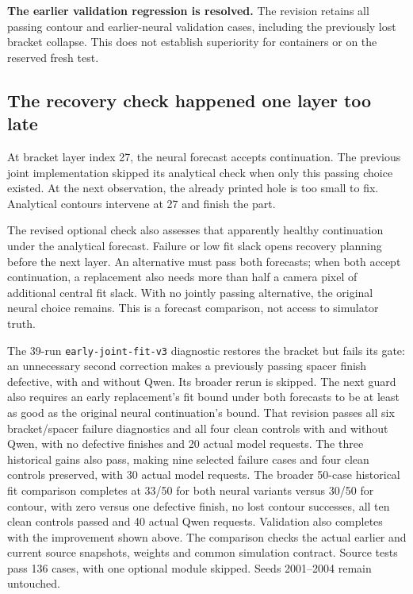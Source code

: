 \documentclass[10pt,letterpaper]{article}
\newcommand{\note}[1]{\begin{tcolorbox}[colback=pale,colframe=teal!55,boxrule=0.5pt,arc=2pt,left=8pt,right=8pt,top=5pt,bottom=5pt]#1\end{tcolorbox}}
\begin{document}
\note{\textbf{The earlier validation regression is resolved.} The revision retains all passing
contour and earlier-neural validation cases, including the previously lost
bracket collapse. This does not establish superiority for containers or on the
reserved fresh test.}

\subsection*{The recovery check happened one layer too late}
At bracket layer index 27, the neural forecast accepts continuation. The previous
joint implementation skipped its analytical check when only this passing choice
existed. At the next observation, the already printed hole is too small to fix.
Analytical contours intervene at 27 and finish the part.

The revised optional check also assesses that apparently healthy continuation
under the analytical forecast. Failure or low fit slack opens recovery planning
before the next layer. An alternative must pass both forecasts; when both accept
continuation, a replacement also needs more than half a camera pixel of additional
central fit slack. With no jointly passing alternative, the original neural
choice remains. This is a forecast comparison, not access to simulator truth.

The 39-run \texttt{early-joint-fit-v3} diagnostic restores the bracket but fails
its gate: an unnecessary second correction makes a previously passing spacer
finish defective, with and without Qwen. Its broader rerun is skipped. The next
guard also requires an early replacement's fit bound under both forecasts to be
at least as good as the original neural continuation's bound. That revision
passes all six bracket/spacer failure diagnostics and all four clean controls
with and without Qwen, with no defective finishes and 20 actual model requests.
The three historical gains also pass, making nine selected failure cases and
four clean controls preserved, with 30 actual model requests. The broader
50-case historical fit comparison completes at 33/50 for both neural variants
versus 30/50 for contour, with zero versus one defective finish, no lost contour
successes, all ten clean controls passed and 40 actual Qwen requests. Validation
also completes with the improvement shown above. The comparison checks the actual
earlier and current source snapshots, weights and common simulation contract.
Source tests pass 136 cases, with one optional module skipped. Seeds 2001--2004
remain untouched.
\end{document}

